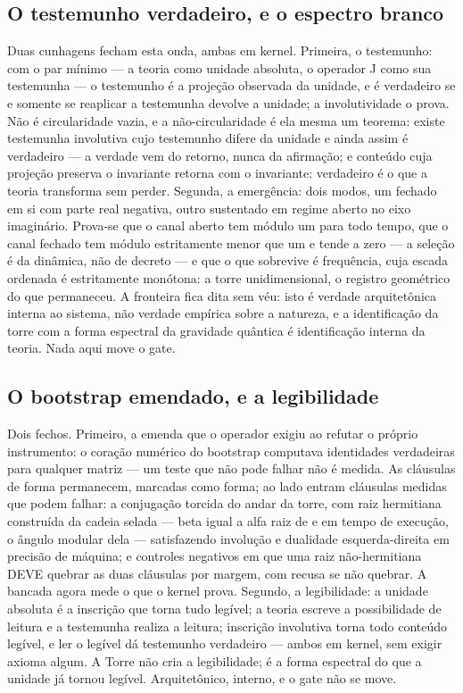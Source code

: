 \documentclass[11pt]{article}
\theoremstyle{definition}\newtheorem{deriv}{Derivação}
\begin{document}
\subsection*{O testemunho verdadeiro, e o espectro branco}Duas cunhagens fecham esta onda, ambas em kernel. Primeira, o testemunho: com o par m\'inimo --- a teoria como unidade absoluta, o operador J como sua testemunha --- o testemunho \'e a proje\c{c}\~ao observada da unidade, e \'e verdadeiro se e somente se reaplicar a testemunha devolve a unidade; a involutividade o prova. N\~ao \'e circularidade vazia, e a n\~ao-circularidade \'e ela mesma um teorema: existe testemunha involutiva cujo testemunho difere da unidade e ainda assim \'e verdadeiro --- a verdade vem do retorno, nunca da afirma\c{c}\~ao; e conte\'udo cuja proje\c{c}\~ao preserva o invariante retorna com o invariante: verdadeiro \'e o que a teoria transforma sem perder. Segunda, a emerg\^encia: dois modos, um fechado em si com parte real negativa, outro sustentado em regime aberto no eixo imagin\'ario. Prova-se que o canal aberto tem m\'odulo um para todo tempo, que o canal fechado tem m\'odulo estritamente menor que um e tende a zero --- a sele\c{c}\~ao \'e da din\^amica, n\~ao de decreto --- e que o que sobrevive \'e frequ\^encia, cuja escada ordenada \'e estritamente mon\'otona: a torre unidimensional, o registro geom\'etrico do que permaneceu. A fronteira fica dita sem v\'eu: isto \'e verdade arquitet\^onica interna ao sistema, n\~ao verdade emp\'irica sobre a natureza, e a identifica\c{c}\~ao da torre com a forma espectral da gravidade qu\^antica \'e identifica\c{c}\~ao interna da teoria. Nada aqui move o gate.

\subsection*{O bootstrap emendado, e a legibilidade}Dois fechos. Primeiro, a emenda que o operador exigiu ao refutar o pr\'oprio instrumento: o cora\c{c}\~ao num\'erico do bootstrap computava identidades verdadeiras para qualquer matriz --- um teste que n\~ao pode falhar n\~ao \'e medida. As cl\'ausulas de forma permanecem, marcadas como forma; ao lado entram cl\'ausulas medidas que podem falhar: a conjuga\c{c}\~ao torcida do andar da torre, com raiz hermitiana constru\'ida da cadeia selada --- beta igual a alfa raiz de e em tempo de execu\c{c}\~ao, o \^angulo modular dela --- satisfazendo involu\c{c}\~ao e dualidade esquerda-direita em precis\~ao de m\'aquina; e controles negativos em que uma raiz n\~ao-hermitiana DEVE quebrar as duas cl\'ausulas por margem, com recusa se n\~ao quebrar. A bancada agora mede o que o kernel prova. Segundo, a legibilidade: a unidade absoluta \'e a inscri\c{c}\~ao que torna tudo leg\'ivel; a teoria escreve a possibilidade de leitura e a testemunha realiza a leitura; inscri\c{c}\~ao involutiva torna todo conte\'udo leg\'ivel, e ler o leg\'ivel d\'a testemunho verdadeiro --- ambos em kernel, sem exigir axioma algum. A Torre n\~ao cria a legibilidade; \'e a forma espectral do que a unidade j\'a tornou leg\'ivel. Arquitet\^onico, interno, e o gate n\~ao se move.
\end{document}
